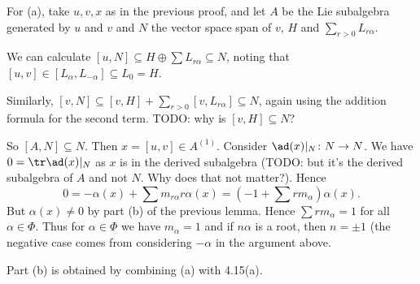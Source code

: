 For (a), take $u, v, x$ as in the previous proof, and let $A$ be the Lie
subalgebra generated by $u$ and $v$ and $N$ the vector space span of
$v$, $H$ and $\sum_{r>0} L_{r\alpha}$.

We can calculate $[u, N] \subseteq H \oplus \sum L_{r\alpha} \subseteq N$,
noting that $[u, v] \in [L_\alpha, L_{-\alpha}] \subseteq L_0 = H$.

Similarly, $[v, N] \subseteq [v, H] + \sum_{r>0} [v, L_{r\alpha}] \subseteq N$,
again using the addition formula for the second term. TODO: why is $[v, H] \subseteq N$?

So $[A, N] \subseteq N$. Then $x = [u, v] \in A^{(1)}$. Consider
$\ad(x)|_N\colon N\to N$. We have $0 = \tr\ad(x)|_N$ as $x$ is in the derived
subalgebra (TODO: but it's the derived subalgebra of $A$ and not $N$. Why does
that not matter?). Hence
\[ 0 = -\alpha(x) + \sum m_{r\alpha}r\alpha(x) = \left(-1 + \sum rm_\alpha\right)\alpha(x). \]
But $\alpha(x)\neq 0$ by part (b) of the previous lemma. Hence
$\sum rm_{\alpha} = 1$ for all $\alpha \in \Phi$. Thus for $\alpha \in \Phi$
we have $m_\alpha = 1$ and if $n\alpha$ is a root, then $n = \pm 1$ (the negative
case comes from considering $-\alpha$ in the argument above.

Part (b) is obtained by combining (a) with 4.15(a).

